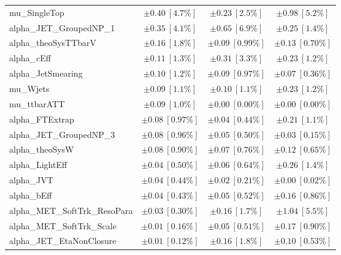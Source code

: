 \begin{table}
\begin{center}
\begin{tabular*}{\textwidth}{@{\extracolsep{\fill}}lccc}
mu\_SingleTop         & $\pm 0.40\ [4.7\%] $          & $\pm 0.23\ [2.5\%] $          & $\pm 0.98\ [5.2\%] $       \\
alpha\_JET\_GroupedNP\_1         & $\pm 0.35\ [4.1\%] $          & $\pm 0.65\ [6.9\%] $          & $\pm 0.25\ [1.4\%] $       \\
alpha\_theoSysTTbarV         & $\pm 0.16\ [1.8\%] $          & $\pm 0.09\ [0.99\%] $          & $\pm 0.13\ [0.70\%] $       \\
alpha\_cEff         & $\pm 0.11\ [1.3\%] $          & $\pm 0.31\ [3.3\%] $          & $\pm 0.23\ [1.2\%] $       \\
alpha\_JetSmearing         & $\pm 0.10\ [1.2\%] $          & $\pm 0.09\ [0.97\%] $          & $\pm 0.07\ [0.36\%] $       \\
mu\_Wjets         & $\pm 0.09\ [1.1\%] $          & $\pm 0.10\ [1.1\%] $          & $\pm 0.23\ [1.2\%] $       \\
mu\_ttbarATT         & $\pm 0.09\ [1.0\%] $          & $\pm 0.00\ [0.00\%] $          & $\pm 0.00\ [0.00\%] $       \\
alpha\_FTExtrap         & $\pm 0.08\ [0.97\%] $          & $\pm 0.04\ [0.44\%] $          & $\pm 0.21\ [1.1\%] $       \\
alpha\_JET\_GroupedNP\_3         & $\pm 0.08\ [0.96\%] $          & $\pm 0.05\ [0.50\%] $          & $\pm 0.03\ [0.15\%] $       \\
alpha\_theoSysW         & $\pm 0.08\ [0.90\%] $          & $\pm 0.07\ [0.76\%] $          & $\pm 0.12\ [0.65\%] $       \\
alpha\_LightEff         & $\pm 0.04\ [0.50\%] $          & $\pm 0.06\ [0.64\%] $          & $\pm 0.26\ [1.4\%] $       \\
alpha\_JVT         & $\pm 0.04\ [0.44\%] $          & $\pm 0.02\ [0.21\%] $          & $\pm 0.00\ [0.02\%] $       \\
alpha\_bEff         & $\pm 0.04\ [0.43\%] $          & $\pm 0.05\ [0.52\%] $          & $\pm 0.16\ [0.86\%] $       \\
alpha\_MET\_SoftTrk\_ResoPara         & $\pm 0.03\ [0.30\%] $          & $\pm 0.16\ [1.7\%] $          & $\pm 1.04\ [5.5\%] $       \\
alpha\_MET\_SoftTrk\_Scale         & $\pm 0.01\ [0.16\%] $          & $\pm 0.05\ [0.51\%] $          & $\pm 0.17\ [0.90\%] $       \\
alpha\_JET\_EtaNonClosure         & $\pm 0.01\ [0.12\%] $          & $\pm 0.16\ [1.8\%] $          & $\pm 0.10\ [0.53\%] $       \\

\end{tabular*}
\end{center}
\end{table}
